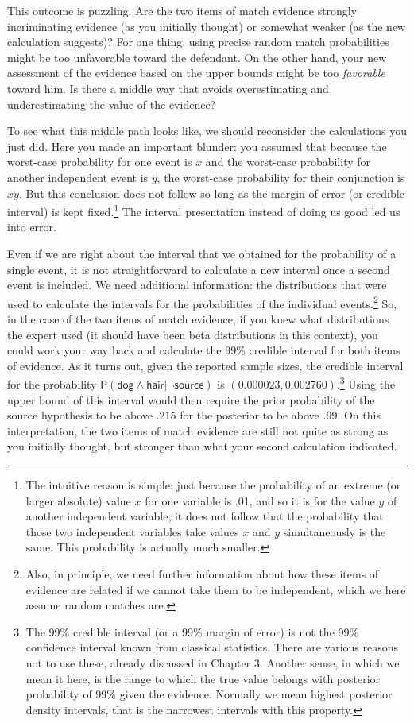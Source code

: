 \documentclass[
  10pt,
  dvipsnames,enabledeprecatedfontcommands]{scrartcl}
\newcommand{\s}[1]{\mbox{$\mathsf{#1}$}}
\begin{document}
This outcome is puzzling. Are the two items of match evidence strongly
incriminating evidence (as you initially thought) or somewhat weaker (as
the new calculation suggests)? For one thing, using precise random match
probabilities might be too unfavorable toward the defendant. On the
other hand, your new assessment of the evidence based on the upper
bounds might be too \emph{favorable} toward him. Is there a middle way
that avoids overestimating and underestimating the value of the
evidence?

To see what this middle path looks like, we should reconsider the
calculations you just did. Here you made an important blunder: you
assumed that because the worst-case probability for one event is \(x\)
and the worst-case probability for another independent event is \(y\),
the worst-case probability for their conjunction is \(xy\). But this
conclusion does not follow so long as the margin of error (or credible
interval) is kept fixed.\footnote{The intuitive reason is simple: just
  because the probability of an extreme (or larger absolute) value \(x\)
  for one variable is .01, and so it is for the value \(y\) of another
  independent variable, it does not follow that the probability that
  those two independent variables take values \(x\) and \(y\)
  simultaneously is the same. This probability is actually much smaller.}
The interval presentation instead of doing us good led us into error.

Even if we are right about the interval that we obtained for the
probability of a single event, it is not straightforward to calculate a
new interval once a second event is included. We need additional
information: the distributions that were used to calculate the intervals
for the probabilities of the individual events.\footnote{Also, in
  principle, we need further information about how these items of
  evidence are related if we cannot take them to be independent, which
  we here assume random matches are.} So, in the case of the two items
of match evidence, if you knew what distributions the expert used (it
should have been beta distributions in this context), you could work
your way back and calculate the 99\% credible interval for both items of
evidence. As it turns out, given the reported sample sizes, the credible
interval for the probability
\(\mathsf{P}(\s{dog}\wedge \s{hair} \vert \neg \s{source})\) is
\((0.000023, 0.002760)\).\footnote{The 99\% credible interval (or a 99\%
  margin of error) is not the 99\% confidence interval known from
  classical statistics. There are various reasons not to use these,
  already discussed in Chapter 3. Another sense, in which we mean it
  here, is the range to which the true value belongs with posterior
  probability of 99\% given the evidence. Normally we mean highest
  posterior density intervals, that is the narrowest intervals with this
  property.} Using the upper bound of this interval would then require
the prior probability of the source hypothesis to be above .215 for the
posterior to be above .99. On this interpretation, the two items of
match evidence are still not quite as strong as you initially thought,
but stronger than what your second calculation indicated.
\end{document}
